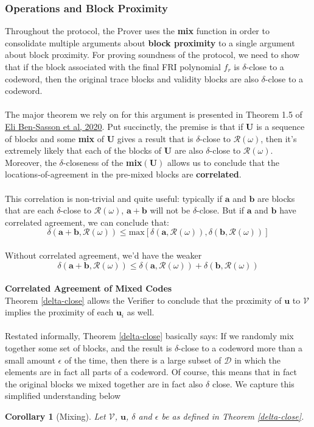 \documentclass[10pt,letterpaper,titlepage]{article}
\newcommand{\w}[0]{\omega}
\newcommand{\dd}[0]{\delta}
\newcommand{\e}[0]{\epsilon}
\newcommand{\D}[0]{\mathcal{D}}
\newtheorem{corollary}{Corollary}
\theoremstyle{definition}
\begin{document}
\begin{appendices}
\subsubsection{Operations and Block Proximity}
Throughout the protocol, the Prover uses the \textbf{mix} function in order to consolidate multiple arguments about \textbf{block proximity} to a single argument about block proximity.
For proving soundness of the protocol, we need to show that if the block associated with the final FRI polynomial $f_r$ is $\delta$-close to a codeword, then the original trace blocks and validity blocks are also $\delta$-close to a codeword.  \\
\\
The major theorem we rely on for this argument is presented in Theorem 1.5 of \href{https://eprint.iacr.org/2020/654.pdf}{Eli Ben-Sasson et al, 2020}.
Put succinctly, the premise is that if $\mathbf{U}$ is a sequence of blocks and some \textbf{mix} of $\mathbf{U}$ gives a result that is $\delta$-close to $\mathcal{R}(\w)$, then it's extremely likely that each of the blocks of $\mathbf{U}$ are also $\delta$-close to $\mathcal{R}(\w)$.
Moreover, the $\delta$-closeness of the \textbf{mix}$(\mathbf{U})$ allows us to conclude that the locations-of-agreement in the pre-mixed blocks are \textbf{correlated}. \\
\\
This correlation is non-trivial and quite useful: typically if $\mathbf{a}$ and $\mathbf{b}$ are blocks that are each $\delta$-close to $\mathcal{R}(\w)$, $\mathbf{a+b}$ will not be $\delta$-close.
But if $\mathbf{a}$ and $\mathbf{b}$ have correlated agreement, we can conclude that:
\[\delta(\mathbf{a}+\mathbf{b},\mathcal{R}(\w)) \leq \text{max}[\delta(\mathbf{a},\mathcal{R}(\w)),\delta(\mathbf{b},\mathcal{R}(\w))]\]
\\
Without correlated agreement, we'd have the weaker \[\delta(\mathbf{a}+\mathbf{b},\mathcal{R}(\w)) \leq \delta(\mathbf{a},\mathcal{R}(\w)) + \delta(\mathbf{b},\mathcal{R}(\w)) \]
\\
\textbf{Correlated Agreement of Mixed Codes}
\\
 Theorem \ref{delta-close} allows the Verifier to conclude that the proximity of $\mathbf{u}$ to $\mathcal{V}$ implies the proximity of each $\mathbf{u}_i$ as well. \\
\\
Restated informally, Theorem \ref*{delta-close} basically says:
If we randomly mix together some set of blocks, and the result is $\delta$-close to a codeword more than a small amount $\epsilon$ of the time, then there is a large subset of $\D$ in which the elements are in fact all parts of a codeword.
Of course, this means that in fact the original blocks we mixed together are in fact also $\dd$ close.
We capture this simplified understanding below
\begin{corollary}[Mixing]
  Let $\mathcal{V}$, $\mathbf{u}$, $\dd$ and $\e$ be as defined in Theorem \ref*{delta-close}.


\end{corollary}
\end{appendices}
\end{document}
